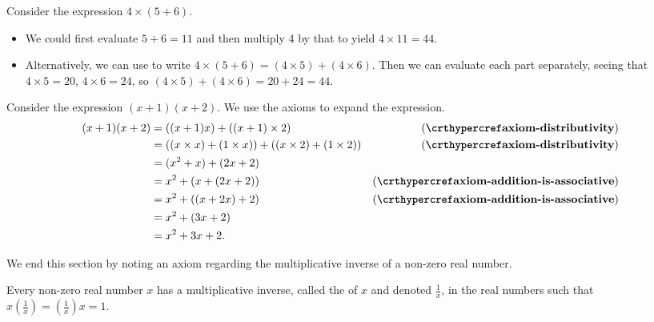 \begin{example}
    Consider the expression $4\times(5+6)$.
    \begin{itemize}
        \item We could first evaluate $5+6=11$ and then multiply 4 by that to yield $4\times11=44$.
        \item Alternatively, we can use  to write $4\times(5+6) = (4\times5)+(4\times6)$. Then we can evaluate each part separately, seeing that $4\times5 = 20$, $4\times6 = 24$, so $(4\times5)+(4\times6) = 20+24=44$.
    \end{itemize}
\end{example}

\begin{example}
    Consider the expression $(x+1)(x+2)$. We use the axioms to expand the expression.
    \begin{align*}
        (x+1)(x+2) &= ((x+1)x) + ((x+1)\times2) & (\myref{axiom-distributivity})\\
        &= ((x\times x) + (1\times x)) + ((x\times2) + (1\times2)) & (\myref{axiom-distributivity})\\
        &= (x^2+x) + (2x+2)\\
        &= x^2+(x + (2x+2)) & (\myref{axiom-addition-is-associative})\\
        &= x^2+((x + 2x)+2) & (\myref{axiom-addition-is-associative})\\
        &= x^2 + (3x+2)\\
        &= x^2 + 3x + 2.
    \end{align*}
\end{example}

We end this section by noting an axiom regarding the multiplicative inverse of a non-zero real number.
\begin{axiom}\label{axiom-reciprocal}
    Every non-zero real number $x$ has a multiplicative inverse, called the  of $x$ and denoted $\frac1x$, in the real numbers such that $x\left(\frac1x\right) = \left(\frac1x\right)x = 1$.
\end{axiom}

